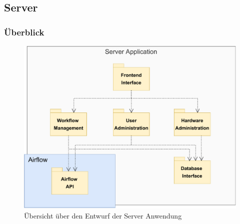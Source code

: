 \subsection{Server}

\subsubsection{Überblick}
\begin{figure}[h]
    \includegraphics[width=1\textwidth]{res/Moduluebersicht.pdf}
    \caption{Übersicht über den Entwurf der Server Anwendung}
\end{figure}

